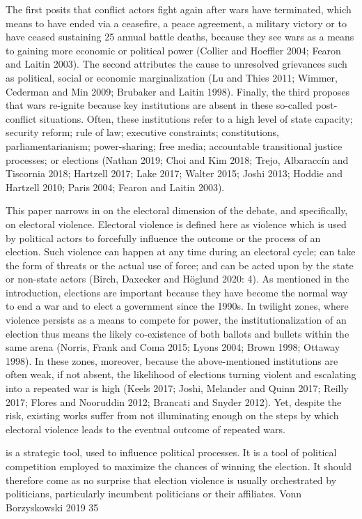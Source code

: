 \documentclass [11pt]{article}
\begin{document}
The first posits that conflict actors fight again after wars have terminated, which means to have ended via a ceasefire, a peace agreement, a military victory or to have ceased sustaining 25 annual battle deaths, because they see wars as a means to gaining more economic or political power (Collier and Hoeffler 2004; Fearon and Laitin 2003). The second attributes the cause to unresolved grievances such as political, social or economic marginalization (Lu and Thies 2011; Wimmer, Cederman and Min 2009; Brubaker and Laitin 1998). Finally, the third proposes that wars re-ignite because key institutions are absent in these so-called post-conflict situations. Often, these institutions refer to a high level of state capacity; security reform; rule of law; executive constraints; constitutions, parliamentarianism; power-sharing; free media; accountable transitional justice processes; or elections (Nathan 2019; Choi and Kim 2018; Trejo, Albaraccín and Tiscornia 2018; Hartzell 2017; Lake 2017; Walter 2015; Joshi 2013; Hoddie and Hartzell 2010; Paris 2004; Fearon and Laitin 2003).

This paper narrows in on the electoral dimension of the debate, and specifically, on electoral violence. Electoral violence is defined here as violence which is used by political actors to forcefully influence the outcome or the process of an election. Such violence can happen at any time during an electoral cycle; can take the form of threats or the actual use of force; and can be acted upon by the state or non-state actors (Birch, Daxecker and Höglund 2020: 4). As mentioned in the introduction, elections are important because they have become the normal way to end a war and to elect a government since the 1990s. In twilight zones, where violence persists as a means to compete for power, the institutionalization of an election thus means the likely co-existence of both ballots and bullets within the same arena (Norris, Frank and Coma 2015; Lyons 2004; Brown 1998; Ottaway 1998). In these zones, moreover, because the above-mentioned institutions are often weak, if not absent, the likelihood of elections turning violent and escalating into a repeated war is high (Keels 2017; Joshi, Melander and Quinn 2017; Reilly 2017; Flores and Nooruddin 2012; Brancati and Snyder 2012). Yet, despite the risk, existing works suffer from not illuminating enough on the steps by which electoral violence leads to the eventual outcome of repeated wars.




is a strategic tool, used to influence political processes. It is a tool of political competition
employed to maximize the chances of winning the election. It should
therefore come as no surprise that election violence is usually orchestrated by
politicians, particularly incumbent politicians or their affiliates.
Vonn Borzyskowski 2019 35
\end{document}
